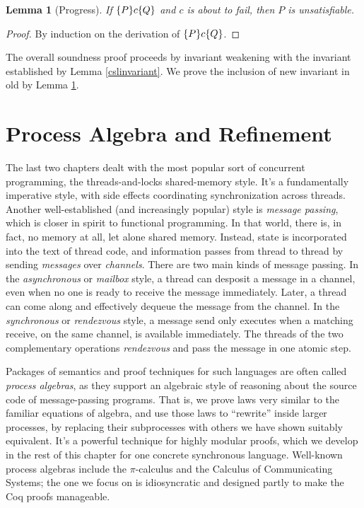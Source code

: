 \documentclass{amsbook}
\newtheorem{lemma}[theorem]{Lemma}
\theoremstyle{definition}
\theoremstyle{remark}
\numberwithin{section}{chapter}
\numberwithin{equation}{chapter}
\begin{document}
\begin{lemma}[Progress]\label{cslprogress}
  If $\{P\} c \{Q\}$ and $c$ is about to fail, then $P$ is unsatisfiable.
\end{lemma}
\begin{proof}
  By induction on the derivation of $\{P\} c \{Q\}$.
\end{proof}

The overall soundness proof proceeds by invariant weakening with the invariant established by Lemma \ref{cslinvariant}.
We prove the inclusion of new invariant in old by Lemma \ref{cslprogress}.



\chapter{Process Algebra and Refinement}

The last two chapters dealt with the most popular sort of concurrent programming, the threads-and-locks shared-memory style.
It's a fundamentally imperative style, with side effects coordinating synchronization across threads.
Another well-established (and increasingly popular) style is \emph{message passing}, which is closer in spirit to functional programming.
In that world, there is, in fact, no memory at all, let alone shared memory.
Instead, state is incorporated into the text of thread code, and information passes from thread to thread by sending \emph{messages} over \emph{channels}.
There are two main kinds of message passing.
In the \emph{asynchronous} or \emph{mailbox} style, a thread can desposit a message in a channel, even when no one is ready to receive the message immediately.
Later, a thread can come along and effectively dequeue the message from the channel.
In the \emph{synchronous} or \emph{rendezvous} style, a message send only executes when a matching receive, on the same channel, is available immediately.
The threads of the two complementary operations \emph{rendezvous} and pass the message in one atomic step.

Packages of semantics and proof techniques for such languages are often called \emph{process algebras}, as they support an algebraic style of reasoning about the source code of message-passing programs.
That is, we prove laws very similar to the familiar equations of algebra, and use those laws to ``rewrite'' inside larger processes, by replacing their subprocesses with others we have shown suitably equivalent.
It's a powerful technique for highly modular proofs, which we develop in the rest of this chapter for one concrete synchronous language.
Well-known process algebras include the $\pi$-calculus and the Calculus of Communicating Systems; the one we focus on is idiosyncratic and designed partly to make the Coq proofs manageable.
\end{document}
